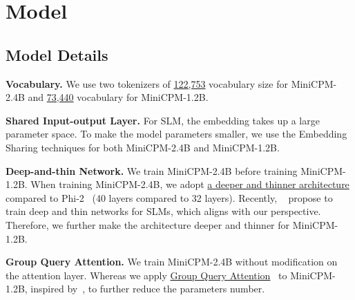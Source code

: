 \section{Model}

\subsection{Model Details}
\noindent\textbf{Vocabulary.} We use two tokenizers of \uline{122,753} vocabulary size for MiniCPM-2.4B and \uline{73,440} vocabulary for MiniCPM-1.2B.

\noindent\textbf{Shared Input-output Layer.}
For SLM, the embedding takes up a large parameter space. To make the model parameters smaller, we use the Embedding Sharing techniques for both MiniCPM-2.4B and MiniCPM-1.2B. 

\noindent\textbf{Deep-and-thin Network.} We train MiniCPM-2.4B before training MiniCPM-1.2B. When training MiniCPM-2.4B, we adopt \uline{a deeper and thinner architecture} compared to Phi-2~\citep{Javaheripi2023Phi2} (40 layers compared to 32 layers). Recently, ~\cite{liu2024mobilellm} propose to train deep and thin networks for SLMs, which aligns with our perspective. Therefore, we further make the architecture deeper and thinner for MiniCPM-1.2B. 

\noindent\textbf{Group Query Attention.} We train MiniCPM-2.4B without modification on the attention layer. Whereas we apply \uline{Group Query Attention}~\citep{ainslie-etal-2023-gqa} to MiniCPM-1.2B, inspired by~\cite{liu2024mobilellm}, to further reduce the parameters number.

\label{sec:model}
\begin{table}[htbp]
    \centering
{}
    \caption{Model configurations for MiniCPM. N (B), $d_m$, $d_{ff}$, $d_h$, $n_q$, $n_{kv}$, $L$, Batch size (M), Tokens (T) represents the number of non-embedding parameters of the model, model hidden dimension, feedforward layer bottleneck dimension, attention head dimension, number of queries, number key/values, number of layers, training batch size, total training tokens.}
    \label{tab:model_configs}
\end{table}

